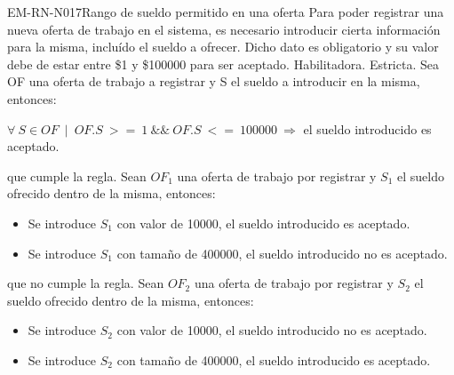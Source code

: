 \begin{BussinesRule}{EM-RN-N017}{Rango de sueldo permitido en una oferta}
	\BRitem[Descripción:] Para poder registrar una nueva oferta de trabajo en el sistema, es necesario introducir cierta información para la misma, incluído el sueldo a ofrecer. Dicho dato es obligatorio y su valor debe de estar entre \$1 y \$100000 para ser aceptado.
	\BRitem[Tipo: ] Habilitadora.
	\BRitem[Nivel: ] Estricta.
	\BRitem[Sentenia: ] Sea OF una oferta de trabajo a registrar y S el sueldo a introducir en la misma, entonces:
	\begin{center}
		$\forall \: S \in OF \: \mid \: OF.S \: >= \: 1 \: \&\& \: OF.S \: <= \: 100000 \: \Rightarrow$ el sueldo introducido es aceptado.
	\end{center}
	 que cumple la regla.
		Sean $OF_{1}$ una oferta de trabajo por registrar y $S_{1}$ el sueldo ofrecido dentro de la misma, entonces:
		\begin{itemize}
			\item Se introduce $S_{1}$ con valor de 10000, el sueldo introducido es aceptado.
			\item Se introduce $S_{1}$ con tamaño de 400000, el sueldo introducido no es aceptado.
		\end{itemize}
	 que no cumple la regla.
		Sean $OF_{2}$ una oferta de trabajo por registrar y $S_{2}$ el sueldo ofrecido dentro de la misma, entonces:
		\begin{itemize}
			\item Se introduce $S_{2}$ con valor de 10000, el sueldo introducido no es aceptado.
			\item Se introduce $S_{2}$ con tamaño de 400000, el sueldo introducido es aceptado.
		\end{itemize}
\end{BussinesRule}


